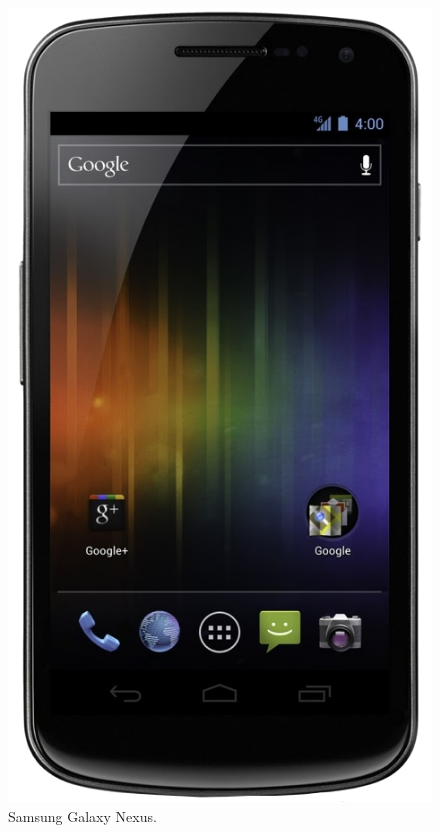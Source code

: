 \begin{figure}
  \centering
    \includegraphics[scale=0.3]{./Introduccion/imagenes/nexus.png}
  \caption{Samsung Galaxy Nexus.}
  \label{fig:nexus}
\end{figure}
